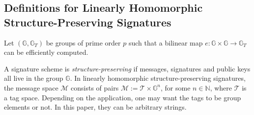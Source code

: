 \documentclass[10pt]{llncs}
\newcommand{\G}{\mathbb{G}}
\begin{document}
\subsection{Definitions for Linearly Homomorphic Structure-Preserving
  Signatures}\label{hom-sig-sec-defs}    

Let $(\G,\G_T)$ be groups of prime order $p$ such that a bilinear map
$e:\G \times {\G} \rightarrow \G_T$ can be efficiently computed.

A signature scheme is \emph{structure-preserving} \cite{DBLP:journals/iacr/AbeHO10,DBLP:conf/crypto/AbeFGHO10}
if messages, signatures and public keys all live in the group $\G$.
In linearly homomorphic structure-preserving signatures, the message
space $\mathcal{M}$ consists of pairs $\mathcal{M} := \mathcal{T}
\times \G^n$, for some $n \in \mathbb{N}$, where $\mathcal{T}$ is a
tag space.  Depending on the application, one may want the tags to be
group elements or not. In this paper, they can be arbitrary strings.
    
\end{document}
